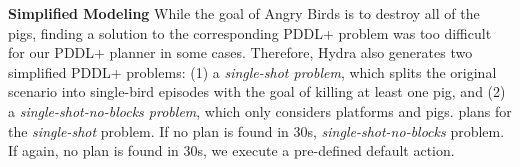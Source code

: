 \documentclass[letterpaper]{article} %
\begin{document}


\noindent\textbf{Simplified Modeling} While the goal of Angry Birds is to destroy all of the pigs, finding a solution to the corresponding PDDL+ problem was too difficult for our PDDL+ planner in some cases.
Therefore, Hydra also generates two simplified PDDL+ problems:
(1) a \textit{single-shot problem}, which splits the original scenario into single-bird episodes with the goal of killing at least one pig, and (2) a \textit{single-shot-no-blocks problem}, which only considers platforms and pigs.  plans for the \textit{single-shot} problem.
If no plan is found in 30s,  \textit{single-shot-no-blocks} problem.
If again, no plan is found in 30s, we execute a pre-defined default action.
\end{document}
